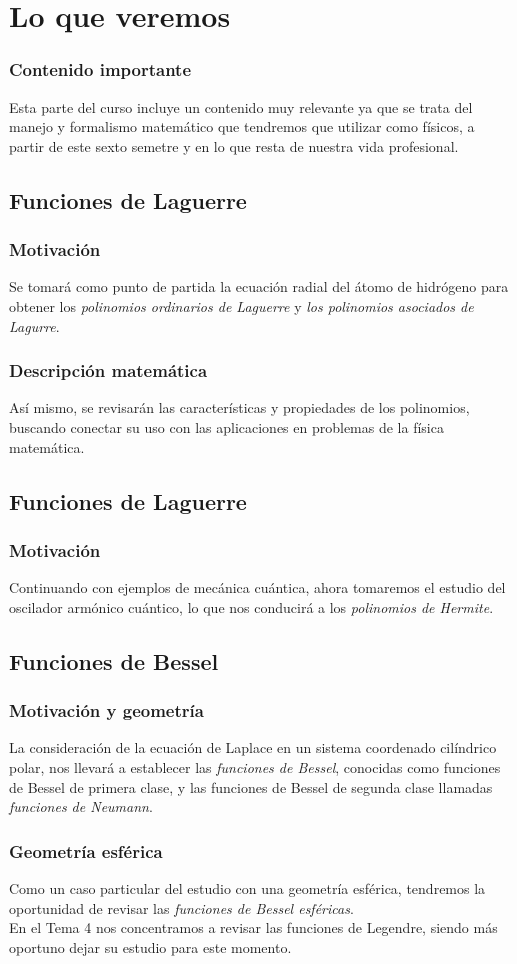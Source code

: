 \section{Lo que veremos}
\begin{frame}
\frametitle{Contenido importante}
Esta parte del curso incluye un contenido muy relevante ya que se trata del manejo y formalismo matemático que tendremos que utilizar como físicos, a partir de este sexto semetre y en lo que resta de nuestra vida profesional.
\end{frame}
\subsection{Funciones de Laguerre}
\begin{frame}
\frametitle{Motivación}
Se tomará como punto de partida la ecuación radial del átomo de hidrógeno para obtener los \emph{polinomios ordinarios de Laguerre} y \emph{los polinomios asociados de Lagurre}.
\end{frame}
\begin{frame}
\frametitle{Descripción matemática}
Así mismo, se revisarán las características y propiedades de los polinomios, buscando conectar su uso con las aplicaciones en problemas de la física matemática.
\end{frame}
\subsection{Funciones de Laguerre}
\begin{frame}
\frametitle{Motivación}
Continuando con ejemplos de mecánica cuántica, ahora tomaremos el estudio del oscilador armónico cuántico, lo que nos conducirá a los \emph{polinomios de Hermite}.
\end{frame}
\subsection{Funciones de Bessel}
\begin{frame}
\frametitle{Motivación y geometría}
La consideración de la ecuación de Laplace en un sistema coordenado cilíndrico polar, nos llevará a establecer las \emph{funciones de Bessel}, conocidas como funciones de Bessel de primera clase, y las funciones de Bessel de segunda clase llamadas \emph{funciones de Neumann}.
\end{frame}
\begin{frame}
\frametitle{Geometría esférica}
Como un caso particular del estudio con una geometría esférica, tendremos la oportunidad de revisar las \emph{funciones de Bessel esféricas}.
\\
\bigskip
En el Tema 4 nos concentramos a revisar las funciones de Legendre, siendo más oportuno dejar su estudio para este momento.
\end{frame}
